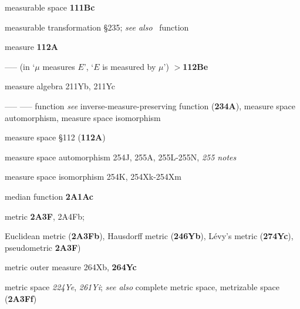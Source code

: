 measurable space {\bf 111Bc}



measurable transformation \S235; 
  {\it see also} \imp\ function

measure {\bf 112A}

----- (in `$\mu$ measures $E$', `$E$ is measured by $\mu$') {\bf $\pmb{>}$112Be}

measure algebra 211Yb, 211Yc






































----- ----- function {\it see} inverse-measure-preserving
function ({\bf 234A}), measure space automorphism,
measure space isomorphism






measure space \S112 ({\bf 112A})

measure space automorphism 254J,
255A, 255L-255N, 
{\it 255 notes}


measure space isomorphism 254K,
254Xk-254Xm









median function {\bf 2A1Ac}





metric {\bf 2A3F}, 2A4Fb;
  
  Euclidean metric ({\bf 2A3Fb}),
  Hausdorff metric ({\bf 246Yb}),
  L\'evy's metric ({\bf 274Yc}),
  pseudometric {\bf 2A3F})




metric outer measure 264Xb, {\bf 264Yc}


metric space {\it 224Ye}, {\it 261Yi}; 
  {\it see also} complete metric space, metrizable space ({\bf 2A3Ff})


